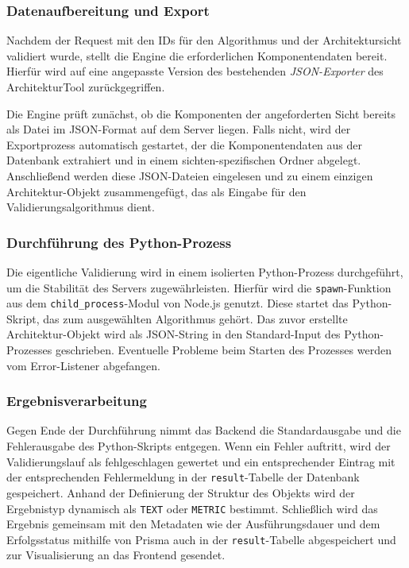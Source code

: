 \subsubsection*{Datenaufbereitung und Export}

Nachdem der Request mit den IDs für den Algorithmus und der Architektursicht validiert wurde, stellt die Engine die erforderlichen Komponentendaten bereit. Hierfür wird auf eine angepasste Version des bestehenden \textit{JSON-Exporter} des ArchitekturTool zurückgegriffen.

Die Engine prüft zunächst, ob die Komponenten der angeforderten Sicht bereits als Datei im JSON-Format auf dem Server liegen. Falls nicht, wird der Exportprozess automatisch gestartet, der die Komponentendaten aus der Datenbank extrahiert und in einem sichten-spezifischen Ordner abgelegt. Anschließend werden diese JSON-Dateien eingelesen und zu einem einzigen Architektur-Objekt zusammengefügt, das als Eingabe für den Validierungsalgorithmus dient.

\subsubsection*{Durchführung des Python-Prozess}

Die eigentliche Validierung wird in einem isolierten Python-Prozess durchgeführt, um die Stabilität des Servers zugewährleisten. Hierfür wird die \texttt{spawn}-Funktion aus dem \texttt{child\_process}-Modul von Node.js genutzt. Diese startet das Python-Skript, das zum ausgewählten Algorithmus gehört. Das zuvor erstellte Architektur-Objekt wird als JSON-String in den Standard-Input des Python-Prozesses geschrieben. Eventuelle Probleme beim Starten des Prozesses werden vom Error-Listener abgefangen.

\subsubsection*{Ergebnisverarbeitung}

Gegen Ende der Durchführung nimmt das Backend die Standardausgabe und die Fehlerausgabe des Python-Skripts entgegen. Wenn ein Fehler auftritt, wird der Validierungslauf als fehlgeschlagen gewertet und ein entsprechender Eintrag mit der entsprechenden Fehlermeldung in der \texttt{result}-Tabelle der Datenbank gespeichert. Anhand der Definierung der Struktur des Objekts wird der Ergebnistyp dynamisch als \texttt{TEXT} oder \texttt{METRIC} bestimmt. Schließlich wird das Ergebnis gemeinsam mit den Metadaten wie der Ausführungsdauer und dem Erfolgsstatus mithilfe von Prisma auch in der \texttt{result}-Tabelle abgespeichert und zur Visualisierung an das Frontend gesendet.

